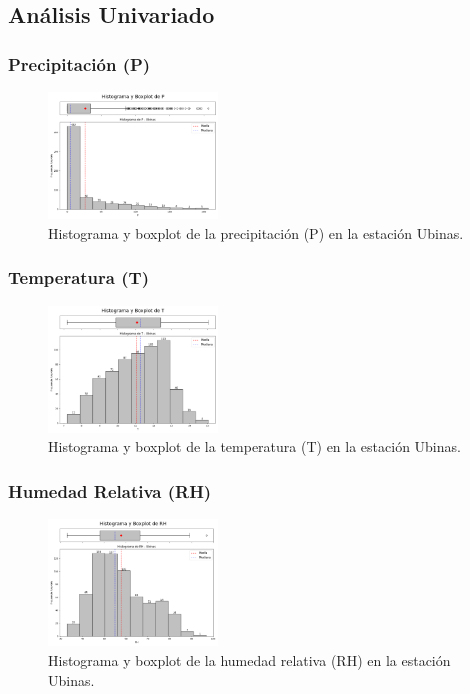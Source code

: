 \subsection{Análisis Univariado}

\subsubsection*{Precipitación (P)}
\begin{figure}[H]
\centering
\includegraphics[width=0.4\textwidth]{resultados/por_estacion_meteorologica/Ubinas/P_histograma.png}
\caption{Histograma y boxplot de la precipitación (P) en la estación Ubinas.}
\label{fig:ubinas_P}
\end{figure}

\subsubsection*{Temperatura (T)}
\begin{figure}[H]
\centering
\includegraphics[width=0.4\textwidth]{resultados/por_estacion_meteorologica/Ubinas/T_histograma.png}
\caption{Histograma y boxplot de la temperatura (T) en la estación Ubinas.}
\label{fig:ubinas_T}
\end{figure}

\subsubsection*{Humedad Relativa (RH)}
\begin{figure}[H]
\centering
\includegraphics[width=0.4\textwidth]{resultados/por_estacion_meteorologica/Ubinas/RH_histograma.png}
\caption{Histograma y boxplot de la humedad relativa (RH) en la estación Ubinas.}
\label{fig:ubinas_RH}
\end{figure}

